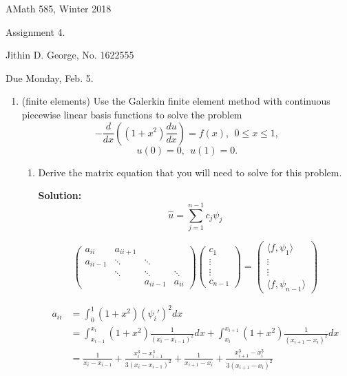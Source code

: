 \documentclass[letterpaper,12pt]{article}
\begin{document}




\noindent
{\scriptsize AMath 585, Winter 2018} \hfill 

\begin{center}
\large
Assignment 4.
\normalsize

Jithin D. George, No. 1622555
\end{center}

\noindent
Due Monday, Feb. 5.




\begin{enumerate}
\item (finite elements)
Use the Galerkin finite element method with continuous piecewise linear
basis functions to solve the problem
\[
- \frac{d}{dx} \left( (1 + x^2 ) \frac{du}{dx} \right) = f(x) ,~~0 \leq x \leq 1,
\]
\[
u(0) = 0,~~u(1) = 0 .
\]
\begin{enumerate}
\item
Derive the matrix equation that you will need to solve for this problem.

{\bf Solution:}
 \[\hat{u} = \sum_{j=1}^{n-1} c_j \psi_j\]      
        
\[
 \left( \begin{array}{ccccc}

a_{ii} & a_{ii+1}  &    &              \\
 a_{ii-1}  & \ddots & \ddots   &    \\
    & \ddots & \ddots  &\ddots   \\
       &        &  a_{ii-1}     & a_{ii} \end{array} \right)
\left( \begin{array}{c}  c_1 \\ \vdots \\ \vdots \\ c_{n-1}  \end{array} 
\right) =
\left( \begin{array}{c}  \langle f,\psi_1 \rangle \\ \vdots \\  \vdots \\
\langle f, \psi_{n-1} \rangle \end{array} \right) 
\]

\begin{align*}
  a_{ii} &= \int_0^1 (1+x^2) (\psi_i')^2 dx\\
  &= \int_{x_{i-1}}^{x_i} (1+x^2) \frac{1}{(x_i-{x_{i-1}})^2} dx + \int_{x_{i}}^{x_{i+1}} (1+x^2) \frac{1}{(x_{i+1}-{x_{i}})^2} dx\\
 &=  \frac{1}{x_i-{x_{i-1}}} +  \frac{x_i^3-{x_{i-1}^3}}{3(x_i-{x_{i-1}})^2}+\frac{1}{x_{i+1}-{x_{i}}} +  \frac{x_{i+1}^3-{x_{i}^3}}{3(x_{i+1}-{x_{i}})^2}
  \end{align*}
  


\end{enumerate}
\end{enumerate}
\end{document}
